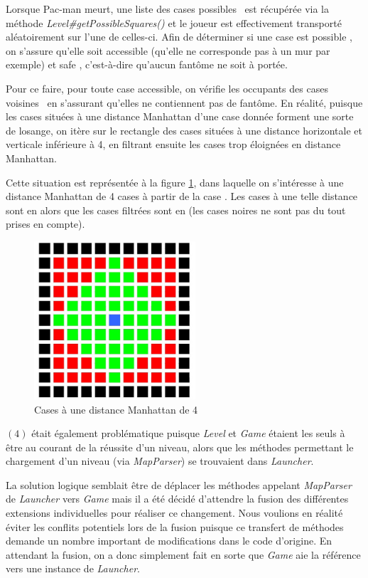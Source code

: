 \documentclass[12pt, openany]{report}
\begin{document}
Lorsque Pac-man meurt, une liste des cases \og possibles \fg \, est récupérée via la méthode \mbox{\textit{Level\#getPossibleSquares()}} et le joueur est effectivement transporté aléatoirement sur l'une de celles-ci. Afin de déterminer si une case est \og possible \fg , on s'assure qu'elle soit accessible (qu'elle ne corresponde pas à un mur par exemple) et \og safe \fg , c'est-à-dire qu'aucun fantôme ne soit à portée.

Pour ce faire, pour toute case accessible, on vérifie les occupants des cases \og voisines \fg \, en s'assurant qu'elles ne contiennent pas de fantôme. En réalité, puisque les cases situées à une distance Manhattan d'une case donnée forment une sorte de losange, on itère sur le rectangle des cases situées à une distance horizontale et verticale inférieure à 4, en filtrant ensuite les cases trop éloignées en distance Manhattan. 

Cette situation est représentée à la figure \ref{manhattan}, dans laquelle on s'intéresse à une distance Manhattan de 4 cases à partir de la case {\color{blue}{bleue}}. Les cases à une telle distance sont en {\color{green}{vert}} alors que les cases filtrées sont en {\color{red}{rouge}} (les cases noires ne sont pas du tout prises en compte).
\begin{figure}[h]
	\centering
	\includegraphics[width=6cm]{Images/manhattan.jpg}
	\caption{\label{manhattan} Cases à une distance Manhattan de 4}
\end{figure}

$(4)$ était également problématique puisque \mbox{\textit{Level}} et \mbox{\textit{Game}} étaient les seuls à être au courant de la réussite d'un niveau, alors que les méthodes permettant le chargement d'un niveau (via \mbox{\textit{MapParser}}) se trouvaient dans \mbox{\textit{Launcher}}. 

La solution logique semblait être de déplacer les méthodes appelant \mbox{\textit{MapParser}} de \mbox{\textit{Launcher}} vers \mbox{\textit{Game}} mais il a été décidé d'attendre la fusion des différentes extensions individuelles pour réaliser ce changement. Nous voulions en réalité éviter les conflits potentiels lors de la fusion puisque ce \og transfert \fg de méthodes demande un nombre important de modifications dans le code d'origine. En attendant la fusion, on a donc simplement fait en sorte que \mbox{\textit{Game}} aie la référence vers une instance de \mbox{\textit{Launcher}}.
\end{document}
